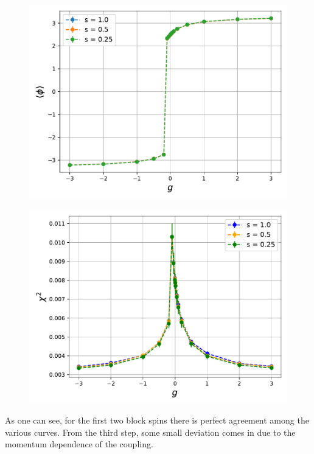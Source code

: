\begin{figure}[h]
    \centering
    \begin{minipage}{0.45\textwidth}
        \includegraphics[scale=0.5]{figures/yukawa_scan/phi.pdf}
        \label{fig:yukawa_scan_phi}
    \end{minipage}
    \hfill
    \begin{minipage}{0.45\textwidth}
        \includegraphics[scale=0.5]{figures/yukawa_scan/chi2.pdf}
        \label{fig:yukawa_scan_chi2}
    \end{minipage}
\end{figure}

As one can see, for the first two block spins there is perfect agreement among the various curves. From the third step, some small deviation comes in due to the momentum dependence of the coupling.


